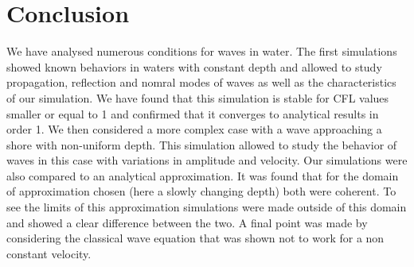 \section{Conclusion}
We have analysed numerous conditions for waves in water. The first simulations showed known behaviors in waters with constant depth and allowed to study propagation, reflection and nomral modes of waves as well as the characteristics of our simulation. We have found that this simulation is stable for CFL values smaller or equal to 1 and confirmed that it converges to analytical results in order 1. We then considered a more complex case with a wave approaching a shore with non-uniform depth. This simulation allowed to study the behavior of waves in this case with variations in amplitude and velocity. Our simulations were also compared to an analytical approximation. It was found that for the domain of approximation chosen (here a slowly changing depth) both were coherent. To see the limits of this approximation simulations were made outside of this domain and showed a clear difference between the two. A final point was made by considering the classical wave equation that was shown not to work for a non constant velocity.

